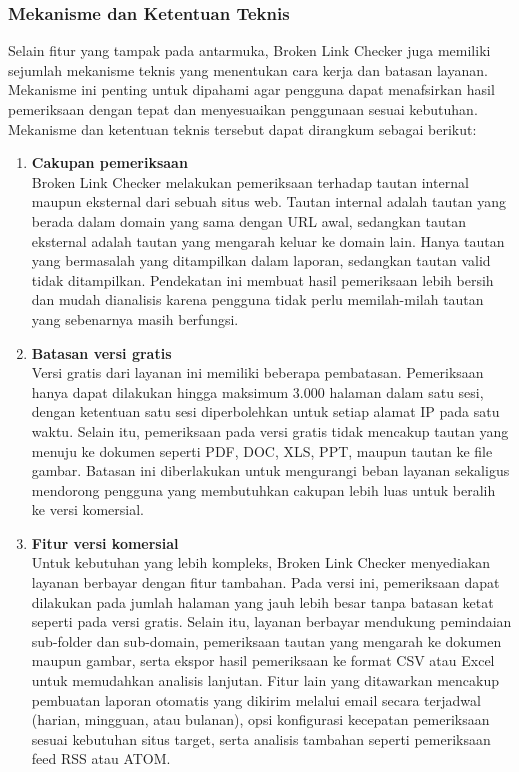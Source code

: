 \subsubsection*{Mekanisme dan Ketentuan Teknis}  
Selain fitur yang tampak pada antarmuka, Broken Link Checker juga memiliki sejumlah mekanisme teknis yang menentukan cara kerja dan batasan layanan. Mekanisme ini penting untuk dipahami agar pengguna dapat menafsirkan hasil pemeriksaan dengan tepat dan menyesuaikan penggunaan sesuai kebutuhan. Mekanisme dan ketentuan teknis tersebut dapat dirangkum sebagai berikut:

\begin{enumerate}
    \item \textbf{Cakupan pemeriksaan}\\
    Broken Link Checker melakukan pemeriksaan terhadap tautan internal maupun eksternal dari sebuah situs web. Tautan internal adalah tautan yang berada dalam domain yang sama dengan URL awal, sedangkan tautan eksternal adalah tautan yang mengarah keluar ke domain lain. Hanya tautan yang bermasalah yang ditampilkan dalam laporan, sedangkan tautan valid tidak ditampilkan. Pendekatan ini membuat hasil pemeriksaan lebih bersih dan mudah dianalisis karena pengguna tidak perlu memilah-milah tautan yang sebenarnya masih berfungsi.

    \item \textbf{Batasan versi gratis}\\
    Versi gratis dari layanan ini memiliki beberapa pembatasan. Pemeriksaan hanya dapat dilakukan hingga maksimum 3.000 halaman dalam satu sesi, dengan ketentuan satu sesi diperbolehkan untuk setiap alamat IP pada satu waktu. Selain itu, pemeriksaan pada versi gratis tidak mencakup tautan yang menuju ke dokumen seperti PDF, DOC, XLS, PPT, maupun tautan ke file gambar. Batasan ini diberlakukan untuk mengurangi beban layanan sekaligus mendorong pengguna yang membutuhkan cakupan lebih luas untuk beralih ke versi komersial.

    \item \textbf{Fitur versi komersial}\\
    Untuk kebutuhan yang lebih kompleks, Broken Link Checker menyediakan layanan berbayar dengan fitur tambahan. Pada versi ini, pemeriksaan dapat dilakukan pada jumlah halaman yang jauh lebih besar tanpa batasan ketat seperti pada versi gratis. Selain itu, layanan berbayar mendukung pemindaian sub-folder dan sub-domain, pemeriksaan tautan yang mengarah ke dokumen maupun gambar, serta ekspor hasil pemeriksaan ke format CSV atau Excel untuk memudahkan analisis lanjutan. Fitur lain yang ditawarkan mencakup pembuatan laporan otomatis yang dikirim melalui email secara terjadwal (harian, mingguan, atau bulanan), opsi konfigurasi kecepatan pemeriksaan sesuai kebutuhan situs target, serta analisis tambahan seperti pemeriksaan feed RSS atau ATOM.
\end{enumerate}
